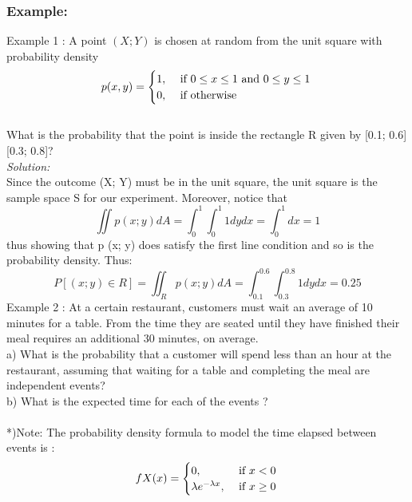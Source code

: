 \documentclass[a4paper]{article}
\begin{document}
	\subsubsection*{Example:} 
	Example 1 : A point $(X; Y )$ is chosen at random from the unit square with probability density\\
	\begin{equation*}
	p(x,y) = \begin{cases}1, & \text{ if } 0 \leq x \leq 1 \text{ and } 0\leq y \leq 1\\ 0,& \text{ if otherwise} \end{cases}\\
	\end{equation*}
	\\
	What is the probability that the point is inside the rectangle R given by [0.1; 0.6] [0.3; 0.8]? \\
	\textit{Solution:} \\
	Since the outcome (X; Y) must be in the unit square, the unit square is the sample space S for our experiment. Moreover, notice that
	\begin{equation*}
	\iint p(x;y) dA = \int_{0}^{1}\int_{0}^{1} 1 dydx = \int_{0}^{1} dx = 1
	\end{equation*}
	thus showing that p (x; y) does satisfy the first line condition and so is the probability density. Thus:
	\begin{equation*}
	P[(x;y) \in R] = \iint_R p(x;y) dA = \int_{0.1}^{0.6}\int_{0.3}^{0.8}1 dydx = 0.25
	\end{equation*}
	Example 2 : At a certain restaurant, customers must wait an average of 10 minutes for a table. From the time they are seated until they have finished their meal requires an additional 30 minutes, on average.\\
	a) What is the probability that a customer will spend less than an hour at the restaurant, assuming that waiting for a table and completing the meal are independent events?\\
	b) What is the expected time for each of the events ?\\\\
	*)Note: The probability density formula to model the time elapsed between events is :
	\begin{equation*}
	fX(x) = \begin{cases} 0,& \text{ if } x < 0 \\ \lambda e^{-\lambda x}, &\text{ if } x \geq 0 \end{cases} \\
	\end{equation*}
\end{document}
